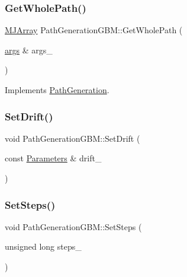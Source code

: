 \hypertarget{classPathGenerationGBM_abcf6790de9e9b4deef334653409a5c3f}{}\label{classPathGenerationGBM_abcf6790de9e9b4deef334653409a5c3f} 
\subsubsection{\texorpdfstring{Get\+Whole\+Path()}{GetWholePath()}}
{\footnotesize\ttfamily \hyperlink{classMJArray}{M\+J\+Array} Path\+Generation\+G\+B\+M\+::\+Get\+Whole\+Path (\begin{DoxyParamCaption}\item[{\hyperlink{path__generation_8h_a75c13cde2074f502cc4348c70528572d}{args} \&}]{args\+\_\+ }\end{DoxyParamCaption})\hspace{0.3cm}{\ttfamily [virtual]}}



Implements \hyperlink{classPathGeneration_ace7520fed7b6a7711f4d3684c974cb76}{Path\+Generation}.

\hypertarget{classPathGenerationGBM_a67aa2511f5cc9d90b81ab97730248e09}{}\label{classPathGenerationGBM_a67aa2511f5cc9d90b81ab97730248e09} 
\subsubsection{\texorpdfstring{Set\+Drift()}{SetDrift()}}
{\footnotesize\ttfamily void Path\+Generation\+G\+B\+M\+::\+Set\+Drift (\begin{DoxyParamCaption}\item[{const \hyperlink{classParameters}{Parameters} \&}]{drift\+\_\+ }\end{DoxyParamCaption})}

\hypertarget{classPathGenerationGBM_ad6e5900646658170c9491b2897c3a4bf}{}\label{classPathGenerationGBM_ad6e5900646658170c9491b2897c3a4bf} 
\subsubsection{\texorpdfstring{Set\+Steps()}{SetSteps()}}
{\footnotesize\ttfamily void Path\+Generation\+G\+B\+M\+::\+Set\+Steps (\begin{DoxyParamCaption}\item[{unsigned long}]{steps\+\_\+ }\end{DoxyParamCaption})\hspace{0.3cm}{\ttfamily [virtual]}}




